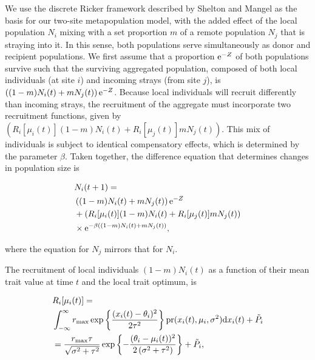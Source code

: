 \documentclass{revtex4}
\begin{document}
We use the discrete Ricker framework described by Shelton and Mangel \citep{Shelton:2011eq} as the basis for our two-site metapopulation model, with the added effect of the local population $N_i$ mixing with a set proportion $m$ of a remote population $N_j$ that is straying into it.
In this sense, both populations serve simultaneously as donor and recipient populations.
We first assume that a proportion ${\rm e}^{-Z}$ of both populations survive such that the surviving aggregated population, composed of both local individuals (at site $i$) and incoming strays (from site $j$), is $\left((1-m)N_i(t) + m N_j(t) \right){\rm e}^{-Z}$.
Because local individuals will recruit differently than incoming strays, the recruitment of the aggregate must incorporate two recruitment functions, given by $\left(R_i[\mu_i(t)] (1-m)N_i(t) + R_i[\mu_j(t)] m N_j(t)\right)$.
This mix of individuals is subject to identical compensatory effects, which is determined by the parameter $\beta$.
Taken together, the difference equation that determines changes in population size is

\begin{align}
  &N_i(t+1) = \\ \nonumber
  &\left((1-m)N_i(t) + m N_j(t) \right){\rm e}^{-Z} \\ \nonumber
  &+ \left(R_i[\mu_i(t)] (1-m)N_i(t) + R_i[\mu_j(t)] m N_j(t)\right) \\ \nonumber
  &\times {\rm e}^{-\beta ((1-m)N_i(t) + m N_j(t))},
  \label{eq:N}
\end{align}

\noindent where the equation for $N_j$ mirrors that for $N_i$.

The recruitment of local individuals $(1-m)N_i(t)$ as a function of their mean trait value at time $t$ and the local trait optimum, is

\begin{align}
  &R_i[\mu_i(t)] = \\ \nonumber
  &\int_{-\infty}^\infty r_{\rm max}\exp\left\{\frac{(x_i(t)-\theta_i)^2}{2\tau^2}\right\} {\rm pr}(x_i(t),\mu_i,\sigma^2) {\rm d}x_i(t) +\tilde{P}_i\\ \nonumber
  &= \frac{r_{\rm max} \tau  }{\sqrt{\sigma ^2+\tau ^2}}\exp\left\{-\frac{(\theta_i-\mu_i(t))^2}{2 \left(\sigma ^2+\tau ^2\right)}\right\} +\tilde{P}_i,
  \label{eq:R}
\end{align}
\end{document}
